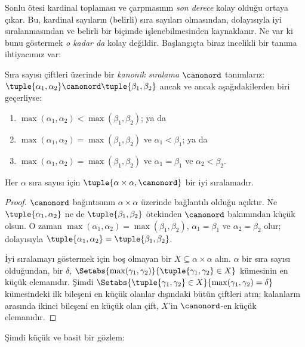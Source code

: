 


Sonlu ötesi kardinal toplaması ve çarpmasının \emph{son derece} kolay
olduğu ortaya çıkar. Bu, kardinal sayıların (belirli) sıra sayıları
olmasından, dolayısıyla iyi sıralanmasından ve belirli bir biçimde
işlenebilmesinden kaynaklanır. Ne var ki bunu göstermek \emph{o kadar da}
kolay değildir. Başlangıçta biraz incelikli bir tanıma ihtiyacımız var:

\begin{defn}
Sıra sayısı çiftleri üzerinde bir \emph{kanonik sıralama} $\canonord$
tanımlarız: $\tuple{\alpha_1, \alpha_2} \canonord
\tuple{\beta_1, \beta_2}$ ancak ve ancak aşağıdakilerden biri geçerliyse:
\begin{enumerate}
	\item $\max(\alpha_1, \alpha_2) < \max(\beta_1, \beta_2)$; ya da
	\item $\max(\alpha_1, \alpha_2) = \max(\beta_1, \beta_2)$ ve
	$\alpha_1 < \beta_1$; ya da
	\item $\max(\alpha_1, \alpha_2) = \max(\beta_1, \beta_2)$ ve
	$\alpha_1 = \beta_1$ ve $\alpha_2 < \beta_2$.
\end{enumerate}
\end{defn}

\begin{lem}
Her $\alpha$ sıra sayısı için $\tuple{\alpha \times \alpha, \canonord}$
bir iyi sıralamadır.
\end{lem}

\begin{proof}
$\canonord$ bağıntısının $\alpha\times\alpha$ üzerinde bağlantılı olduğu
açıktır. Ne $\tuple{\alpha_1,\alpha_2}$ ne de
$\tuple{\beta_1,\beta_2}$ ötekinden $\canonord$ bakımından küçük olsun.
O zaman $\max(\alpha_1,\alpha_2)=\max(\beta_1,\beta_2)$,
$\alpha_1=\beta_1$ ve $\alpha_2=\beta_2$ olur; dolayısıyla
$\tuple{\alpha_1,\alpha_2}=\tuple{\beta_1,\beta_2}$.

İyi sıralamayı göstermek için boş olmayan bir
$X\subseteq\alpha\times\alpha$ alın. $\alpha$ bir sıra sayısı olduğundan,
bir $\delta$, $\Setabs{\max(\gamma_1, \gamma_2)}{\tuple{\gamma_1,
\gamma_2} \in X}$ kümesinin en küçük elemanıdır. Şimdi
$\Setabs{\tuple{\gamma_1,\gamma_2} \in X}{\max(\gamma_1, \gamma_2) =
\delta}$ kümesindeki ilk bileşeni en küçük olanlar dışındaki bütün
çiftleri atın; kalanların arasında ikinci bileşeni en küçük olan çift,
$X$'in $\canonord$-en küçük elemanıdır.
\end{proof}
\noindent
Şimdi küçük ve basit bir gözlem:

